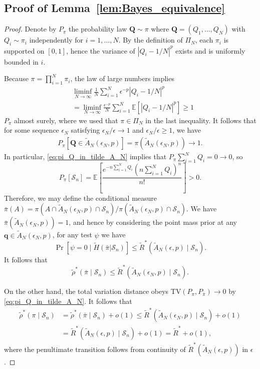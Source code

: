 \documentclass[11pt]{article}
\numberwithin{equation}{section}
\newcommand{\Scal}{\mathcal{S}}
\newcommand{\Prp}[1]{\Pr\left[#1 \right]}
\newcommand{\ex}[1]{\ensuremath{\mathbb{E}\left[ #1\right]}}
\begin{document}
\subsection{Proof of Lemma~\ref{lem:Bayes_equivalence}}
\label{sec:proof_bayes_equiv}
\begin{proof}
Denote by $P_\pi$ the probability law $\mathbf{Q} \sim \pi$ where $\mathbf{Q} = (Q_1,\ldots,Q_N)$ with $Q_i \sim \pi_i$ independently for $i=1,\ldots,N$. By the definition of $\Pi_N$, each $\pi_i$ is supported on $[0,1]$, hence the variance of $|Q_i - 1/N|^p$ exists and is uniformly bounded in $i$.

Because $\pi = \prod_{i=1}^N \pi_i$, the law of large numbers implies
\begin{align*}
& \liminf_{N \to \infty} \frac{1}{N}\sum_{i=1}^N \epsilon^{-p}\left|Q_i - 1/N\right|^p \\
&= \liminf_{N \to \infty} \frac{\epsilon^{-p}}{N}\sum_{i=1}^N \ex{\left|Q_i - 1/N\right|^p} \geq 1
\end{align*}
$P_{\pi}$ almost surely, where we used that $\pi \in \Pi_N$ in the last inequality. It follows that for some sequence $\epsilon_N$ satisfying $\epsilon_N/\epsilon \to 1$ and $\epsilon_N/\epsilon \geq 1$, we have 
\begin{align}
    \label{eq:pi_Q_in_tilde_A_N}
    P_{\pi}\left[\mathbf{Q} \in \tilde{A}_N(\epsilon_N,p)\right] = \pi(\tilde{A}_N(\epsilon_N,p)) \to 1.
\end{align}
In particular, \eqref{eq:pi_Q_in_tilde_A_N} implies that $P_{\pi}{\sum_{i=1}^N Q_i = 0} \to 0$, so 
\[
P_{\pi}[\Scal_n] = \ex{\frac{e^{-n\sum_{i=1}^N Q_i}(n\sum_{i=1}^N Q_i)^n}{n!}} > 0.
\]
Therefore, we may define the conditional measure $\bar{\pi}(A) = \pi(A \cap \tilde{A}_N(\epsilon_N,p) \cap \Scal_n )/\pi(\tilde{A}_N(\epsilon_N,p)\cap \Scal_n)$. We have $\bar{\pi}(\tilde{A}_N(\epsilon_N,p))=1$, and hence by considering the point mass prior at any $\mathbf{q} \in \tilde{A}_N(\epsilon_N,p)$, for any test $\psi$ we have
\[
\Prp{\psi = 0 \mid \tilde{H}(\bar{\pi} | \Scal_n )} \leq \tilde{R}^*(\tilde{A}_N(\epsilon,p) \mid \Scal_n). 
\]
It follows that
\[
\tilde{\rho}^*(\bar{\pi} \mid \Scal_n) \leq \tilde{R}^*(\tilde{A}_N(\epsilon_N,p) \mid \Scal_n). 
\]

On the other hand, the total variation distance obeys $\mathrm{TV}(P_\pi,P_{\bar{\pi}})\to 0$ by \eqref{eq:pi_Q_in_tilde_A_N}. It follows that
\begin{align*}
\tilde{\rho}^*(\pi \mid \Scal_n) & = \tilde{\rho}^*(\bar{\pi} \mid \Scal_n)+o(1) \leq \tilde{R}^*(\tilde{A}_N(\epsilon_N,p) \mid \Scal_n)+o(1) \\
& = \tilde{R}^*(\tilde{A}_N(\epsilon,p) \mid \Scal_n)+o(1) = \tilde{R}^* + o(1),
\end{align*}
where the penultimate transition follows from continuity of $\tilde{R}^*(\tilde{A}_N(\epsilon,p))$ in $\epsilon$.
\end{proof}
\end{document}
